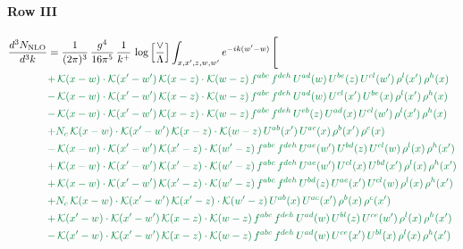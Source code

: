 \documentclass[10pt]{article}
\numberwithin{equation}{section}
\begin{document}
 \paragraph{Row III}
 \begin{align}
\frac{d^{3}N_{\mathrm{NLO}}}{d^{3}k} & = \frac{1}{(2\pi)^{3}}\,\frac{g^{4}}{16\pi^{5}}\,\frac{1}{k^{+}}\,\log\Big[\frac{\vee}{\Lambda}\Big]\int_{x,x',z,w,w'}e^{-ik(w'-w)}\,\Bigg[\notag\\ &{\color{JIM}  +\,\mathcal{K}(x-w)\cdot\mathcal{K}(x'-w')\,\mathcal{K}(x-z)\cdot\mathcal{K}(w-z)\,f^{abc}\,f^{deh}\,U^{ad}(w)\,U^{be}(z)\,U^{cl}(w')\,\rho^{l}(x')\,\rho^{h}(x)} \notag\\
&{\color{JIM} -\,\mathcal{K}(x-w)\cdot\mathcal{K}(x'-w')\,\mathcal{K}(x-z)\cdot\mathcal{K}(w-z)\,f^{abc}\,f^{deh}\,U^{ad}(w)\,U^{cl}(x')\,U^{be}(x)\,\rho^{l}(x')\,\rho^{h}(x)} \notag\\
&{\color{JIM} -\,\mathcal{K}(x-w)\cdot\mathcal{K}(x'-w')\,\mathcal{K}(x-z)\cdot\mathcal{K}(w-z)\,f^{abc}\,f^{deh}\,U^{eb}(z)\,U^{ad}(x)\,U^{cl}(w')\,\rho^{l}(x')\,\rho^{h}(x)} \notag\\
&{\color{JIM} +N_{c}\,\mathcal{K}(x-w)\cdot\mathcal{K}(x'-w')\,\mathcal{K}(x-z)\cdot\mathcal{K}(w-z)\,U^{ab}(x')\,U^{ac}(x)\,\rho^{b}(x')\,\rho^{c}(x)} \notag\\
&{\color{JIM} -\,\mathcal{K}(x-w)\cdot\mathcal{K}(x'-w')\,\mathcal{K}(x'-z)\cdot\mathcal{K}(w'-z)\,f^{abc}\,f^{deh}\,U^{ae}(w')\,U^{bd}(z)\,U^{cl}(w)\,\rho^{l}(x)\,\rho^{h}(x')} \notag\\
&{\color{JIM} +\,\mathcal{K}(x-w)\cdot\mathcal{K}(x'-w')\,\mathcal{K}(x'-z)\cdot\mathcal{K}(w'-z)\,f^{abc}\,f^{deh}\,U^{ae}(w')\,U^{cl}(x)\,U^{bd}(x')\,\rho^{l}(x)\,\rho^{h}(x')} \notag\\
&{\color{JIM} +\,\mathcal{K}(x-w)\cdot\mathcal{K}(x'-w')\,\mathcal{K}(x'-z)\cdot\mathcal{K}(w'-z)\,f^{abc}\,f^{deh}\,U^{bd}(z)\,U^{ae}(x')\,U^{cl}(w)\,\rho^{l}(x)\,\rho^{h}(x')} \notag\\
&{\color{JIM} +N_{c}\,\mathcal{K}(x-w)\cdot\mathcal{K}(x'-w')\,\mathcal{K}(x'-z)\cdot\mathcal{K}(w'-z)\,U^{ab}(x)\,U^{ac}(x')\,\rho^{b}(x)\,\rho^{c}(x')} \notag\\
&{\color{JIM} +\,\mathcal{K}(x'-w)\cdot\mathcal{K}(x'-w')\,\mathcal{K}(x-z)\cdot\mathcal{K}(w-z)\,f^{abc}\,f^{deh}\,U^{ad}(w)\,U^{bl}(z)\,U^{ce}(w')\,\rho^{l}(x)\,\rho^{h}(x')} \notag\\
&{\color{JIM} -\,\mathcal{K}(x'-w)\cdot\mathcal{K}(x'-w')\,\mathcal{K}(x-z)\cdot\mathcal{K}(w-z)\,f^{abc}\,f^{deh}\,U^{ad}(w)\,U^{ce}(x')\,U^{bl}(x)\,\rho^{l}(x)\,\rho^{h}(x')} \notag\\

\end{align}
\end{document}
